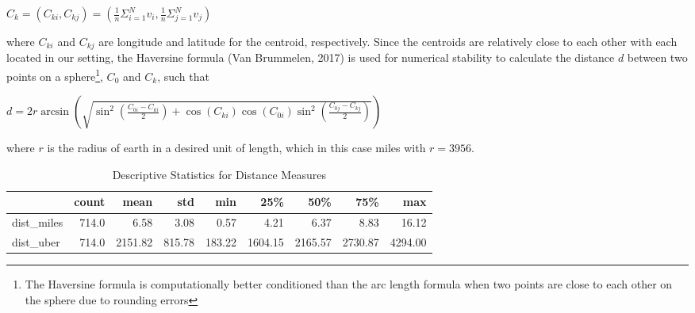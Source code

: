 \documentclass{article}
\begin{document}
\begin{center}
    $C_k = (C_{ki}, C_{kj})  = (\frac{1}{n} \Sigma_{i=1}^{N} v_i, \frac{1}{n} \Sigma_{j=1}^{N} v_j) $
\end{center}

where $C_{ki}$ and $C_{kj}$ are longitude and latitude for the centroid, respectively. Since the centroids are relatively close to each other with each located in our setting, the Haversine formula (Van Brummelen, 2017) is used for numerical stability to calculate the distance $d$ between two points on a sphere\footnote{The Haversine formula is computationally better conditioned than the arc length formula when two points are close to each other on the sphere due to rounding errors}, $C_0$ and $C_k$, such that

\begin{center}
    $d =2 r \arcsin \left(\sqrt{\sin ^{2}\left(\frac{C_{0i}-C_{ki}}{2}\right)+\cos \left(C_{ki}\right) \cos \left(C_{0i}\right) \sin ^{2}\left(\frac{C_{0j}-C_{kj}}{2}\right)}\right)$
\end{center}
where $r$ is the radius of earth in a desired unit of length, which in this case miles with $r = 3956$. 

\begin{table}[t]
\centering
\caption{Descriptive Statistics for Distance Measures} 
  \label{table:distance} 
\begin{tabular}{lrrrrrrrr}
\toprule
{} &  count &     mean &     std &     min &      25\% &      50\% &      75\% &      max \\
\midrule
dist\_miles     &  714.0 &     6.58 &    3.08 &    0.57 &     4.21 &     6.37 &     8.83 &    16.12 \\
dist\_uber &  714.0 &  2151.82 &  815.78 &  183.22 &  1604.15 &  2165.57 &  2730.87 &  4294.00 \\
\bottomrule
\end{tabular}
\end{table}
\end{document}
